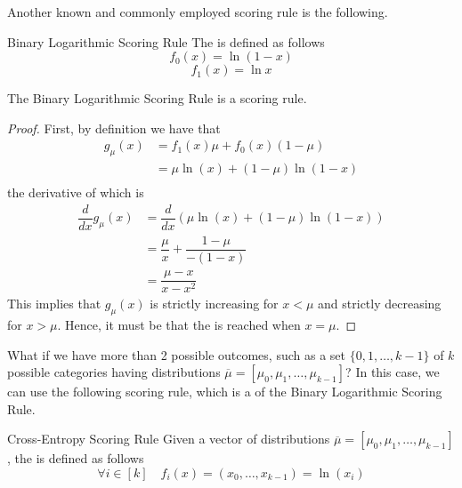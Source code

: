\documentclass[a4paper, 12pt]{report}
\begin{document}
    Another known and commonly employed scoring rule is the following.

    \begin{frameddefn}{Binary Logarithmic Scoring Rule}
        The  is defined as follows $$f_0(x) = \ln(1 - x)$$ $$f_1(x) = \ln x$$
    \end{frameddefn}

    \begin{framedthm}{}
        The Binary Logarithmic Scoring Rule is a scoring rule.
    \end{framedthm}
    
    \begin{proof}
        First, by definition we have that
        \begin{equation*}
            \begin{split}
                g_\mu(x) &= f_1(x)\mu + f_0(x)(1 - \mu) \\
                         &= \mu \ln(x) + (1 - \mu) \ln(1 - x) \\
            \end{split}
        \end{equation*}
        the derivative of which is
        \begin{equation*}
            \begin{split}
                \dfrac{d}{dx}{g_\mu(x)} &= \dfrac{d}{dx}(\mu \ln(x) + (1 - \mu) \ln(1 - x)) \\
                                        &= \dfrac{\mu}{x} + \dfrac{1 - \mu}{ - ( 1 - x)} \\
                                        &= \dfrac{\mu - x}{x - x^2}
            \end{split}
        \end{equation*}
        This implies that $g_\mu(x)$ is strictly increasing for $x < \mu$ and strictly decreasing for $x > \mu$. Hence, it must be that the  is reached when $x = \mu$.
    \end{proof}

    What if we have more than 2 possible outcomes, such as a set $\{0, 1, \ldots, k - 1\}$ of $k$ possible categories having distributions $\overline \mu = [\mu_0, \mu_1, \ldots, \mu_{k - 1}]$? In this case, we can use the following scoring rule, which is a  of the Binary Logarithmic Scoring Rule.

    \begin{frameddefn}{Cross-Entropy Scoring Rule}
        Given a vector of distributions $\overline \mu = [\mu_0, \mu_1, \ldots, \mu_{k - 1}]$, the  is defined as follows $$\forall i \in [k] \quad f_i(x) = (x_0, \ldots, x_{k - 1}) = \ln(x_i)$$
    \end{frameddefn}
\end{document}
